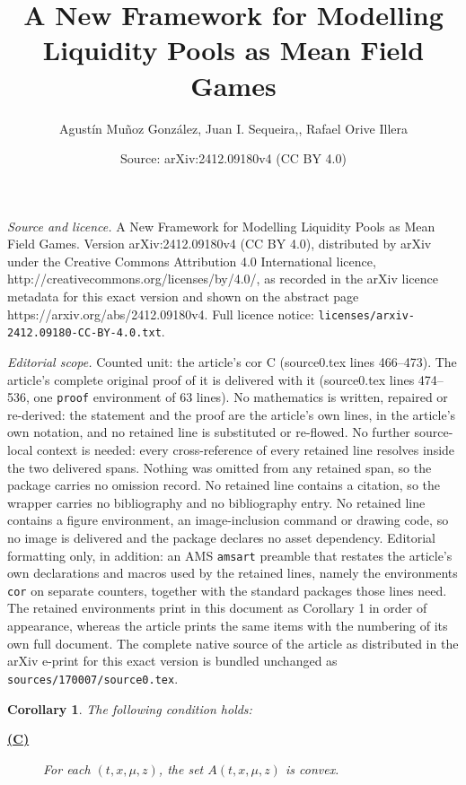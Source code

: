 \documentclass[10pt,a4paper]{amsart}
\title{A New Framework for Modelling Liquidity Pools as Mean Field Games}
\author{Agust\'in Mu\~noz Gonz\'alez, Juan I. Sequeira,, Rafael Orive Illera}
\date{Source: arXiv:2412.09180v4 (CC BY 4.0)}
\newtheorem{cor}{Corollary}
\begin{document}
\maketitle

\noindent\emph{Source and licence.} A New Framework for Modelling Liquidity Pools as Mean Field Games. Version arXiv:2412.09180v4 (CC BY 4.0), distributed by arXiv under the Creative Commons Attribution 4.0 International licence, http://creativecommons.org/licenses/by/4.0/, as recorded in the arXiv licence metadata for this exact version and shown on the abstract page https://arxiv.org/abs/2412.09180v4. Full licence notice: \texttt{licenses/arxiv-2412.09180-CC-BY-4.0.txt}.\par\smallskip

\noindent\textit{Editorial scope.} Counted unit: the article's cor C (source0.tex lines 466--473). The article's complete original proof of it is delivered with it (source0.tex lines 474--536, one \texttt{proof} environment of 63 lines). No mathematics is written, repaired or re-derived: the statement and the proof are the article's own lines, in the article's own notation, and no retained line is substituted or re-flowed.  No further source-local context is needed: every cross-reference of every retained line resolves inside the two delivered spans.  Nothing was omitted from any retained span, so the package carries no omission record.  No retained line contains a citation, so the wrapper carries no bibliography and no bibliography entry.  No retained line contains a figure environment, an image-inclusion command or drawing code, so no image is delivered and the package declares no asset dependency.  Editorial formatting only, in addition: an AMS \texttt{amsart} preamble that restates the article's own declarations and macros used by the retained lines, namely the environments \texttt{cor} on separate counters, together with the standard packages those lines need.  The retained environments print in this document as Corollary 1 in order of appearance, whereas the article prints the same items with the numbering of its own full document.  The complete native source of the article as distributed in the arXiv e-print for this exact version is bundled unchanged as \texttt{sources/170007/source0.tex}.
\begin{cor}
The following condition holds:
\begin{description}
  \item[\textbf{\hyperref[sup: C]{(C)}}]
  \label{sup: C}
 For each \( (t,x,\mu,z) \), the set \( A(t,x,\mu,z) \) is convex.
\end{description}
\end{cor}
\end{document}
